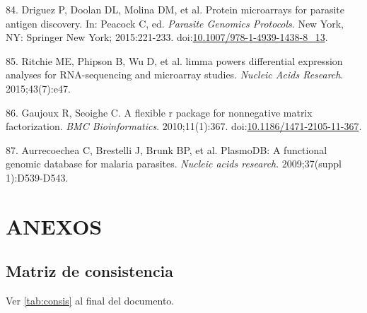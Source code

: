\documentclass[]{article}
\begin{document}
\hypertarget{ref-Driguez2015}{}
84. Driguez P, Doolan DL, Molina DM, et al. Protein microarrays for
parasite antigen discovery. In: Peacock C, ed. \emph{Parasite Genomics
Protocols}. New York, NY: Springer New York; 2015:221-233.
doi:\href{https://doi.org/10.1007/978-1-4939-1438-8_13}{10.1007/978-1-4939-1438-8\_13}.

\hypertarget{ref-limma}{}
85. Ritchie ME, Phipson B, Wu D, et al. limma powers differential
expression analyses for RNA-sequencing and microarray studies.
\emph{Nucleic Acids Research}. 2015;43(7):e47.

\hypertarget{ref-Gaujoux2010NMF}{}
86. Gaujoux R, Seoighe C. A flexible r package for nonnegative matrix
factorization. \emph{BMC Bioinformatics}. 2010;11(1):367.
doi:\href{https://doi.org/10.1186/1471-2105-11-367}{10.1186/1471-2105-11-367}.

\hypertarget{ref-plasmodb}{}
87. Aurrecoechea C, Brestelli J, Brunk BP, et al. PlasmoDB: A functional
genomic database for malaria parasites. \emph{Nucleic acids research}.
2009;37(suppl 1):D539-D543.

\section{ANEXOS}\label{anexos}

\subsection{Matriz de consistencia}\label{matriz-de-consistencia}

Ver \autoref{tab:consis} al final del documento.
\end{document}
